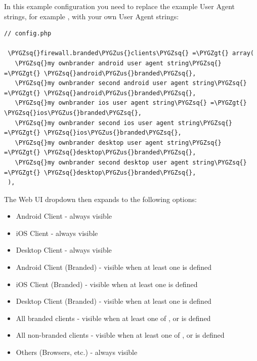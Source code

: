 \documentclass[letterpaper,10pt,english]{sphinxmanual}
\def\PYGZus{\char`\_}
\def\PYGZgt{\char`\>}
\def\PYGZsq{\char`\'}
\renewcommand\PYGZsq{\textquotesingle}
\begin{document}
In this example configuration you need to replace the example User Agent
strings, for example , with your own User Agent strings:

\begin{Verbatim}[commandchars=\\\{\}]
// config.php

 \PYGZsq{}firewall.branded\PYGZus{}clients\PYGZsq{} =\PYGZgt{} array(
   \PYGZsq{}my ownbrander android user agent string\PYGZsq{} =\PYGZgt{} \PYGZsq{}android\PYGZus{}branded\PYGZsq{},
   \PYGZsq{}my ownbrander second android user agent string\PYGZsq{} =\PYGZgt{} \PYGZsq{}android\PYGZus{}branded\PYGZsq{},
   \PYGZsq{}my ownbrander ios user agent string\PYGZsq{} =\PYGZgt{} \PYGZsq{}ios\PYGZus{}branded\PYGZsq{},
   \PYGZsq{}my ownbrander second ios user agent string\PYGZsq{} =\PYGZgt{} \PYGZsq{}ios\PYGZus{}branded\PYGZsq{},
   \PYGZsq{}my ownbrander desktop user agent string\PYGZsq{} =\PYGZgt{} \PYGZsq{}desktop\PYGZus{}branded\PYGZsq{},
   \PYGZsq{}my ownbrander second desktop user agent string\PYGZsq{} =\PYGZgt{} \PYGZsq{}desktop\PYGZus{}branded\PYGZsq{},
 ),
\end{Verbatim}

The Web UI dropdown then expands to the following options:
\begin{itemize}
\item {} 
Android Client - always visible

\item {} 
iOS Client - always visible

\item {} 
Desktop Client - always visible

\item {} 
Android Client (Branded) - visible when at least one  is defined

\item {} 
iOS Client (Branded) - visible when at least one  is defined

\item {} 
Desktop Client (Branded) - visible when at least one  is defined

\item {} 
All branded clients - visible when at least one of ,
 or  is defined

\item {} 
All non-branded clients - visible when at least one of ,
 or  is defined

\item {} 
Others (Browsers, etc.) - always visible

\end{itemize}
\end{document}

